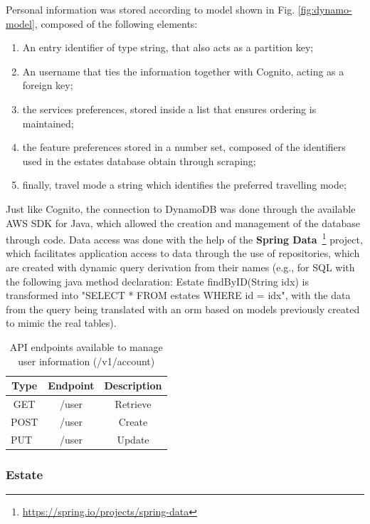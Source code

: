 Personal information was stored according to model shown in Fig. \ref{fig:dynamo-model}, composed of the following elements: 

\begin{enumerate}
    \item An entry identifier of type string, that also acts as a partition key;
    \item An username that ties the information together with Cognito, acting as a foreign key;
    \item the services preferences, stored inside a list that ensures ordering is maintained;
    \item the feature preferences stored in a number set, composed of the identifiers used in the estates database obtain through scraping;
    \item finally, travel mode a string which identifies the preferred travelling mode;
\end{enumerate}

Just like Cognito, the connection to DynamoDB was done through the available AWS SDK for Java, which allowed the creation and management of the database through code. Data access was done with the help of the \textbf{Spring Data}~\footnote{\url{https://spring.io/projects/spring-data}} project, which facilitates application access to data through the use of repositories, which are created with dynamic query derivation from their names (e.g., for SQL with the following java method declaration: Estate findByID(String idx) is transformed into "SELECT * FROM estates WHERE id = idx", with the data from the query being translated with an \acrshort{orm} based on models previously created to mimic the real tables).

\begin{table}[t]
\centering
\caption[User service endpoints]{API endpoints available to manage user information (/v1/account)}
\begin{tabular}{c|c|c}
Type                     & Endpoint & Description \\ \hline
GET                      & /user    & Retrieve    \\
POST                     & /user    & Create      \\
\multicolumn{1}{l|}{PUT} & /user    & Update     
\end{tabular}

\label{tbl:accountAPI}
\end{table}


\subsubsection{Estate}
\label{sss:estate}

